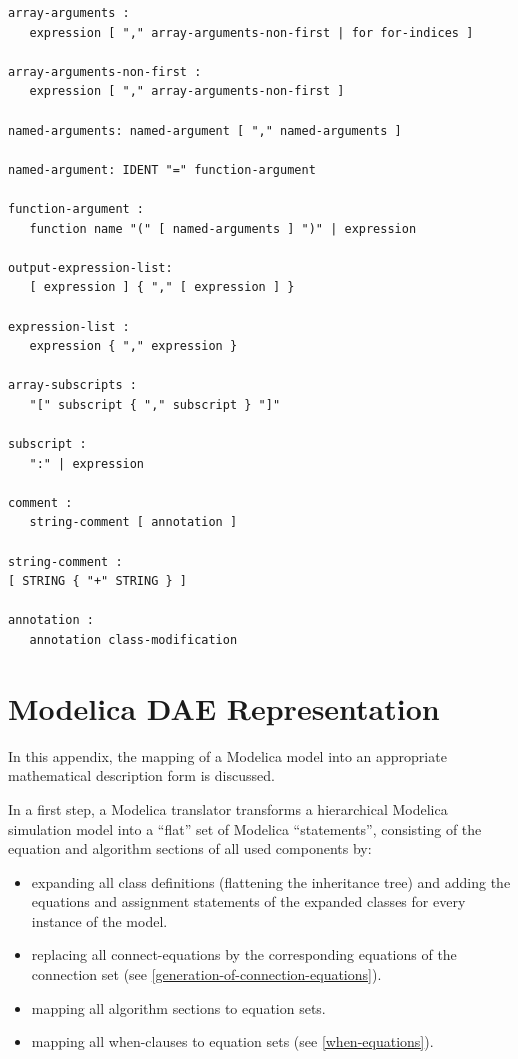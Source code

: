 \documentclass[10pt,a4paper]{report}
\def\doublelabel#1{\label{#1}\hypertarget{#1}{}}
\begin{document}
\begin{lstlisting}[language=grammar]
array-arguments :
   expression [ "," array-arguments-non-first | for for-indices ]

array-arguments-non-first :
   expression [ "," array-arguments-non-first ]

named-arguments: named-argument [ "," named-arguments ]

named-argument: IDENT "=" function-argument

function-argument :
   function name "(" [ named-arguments ] ")" | expression
   
output-expression-list:
   [ expression ] { "," [ expression ] }
   
expression-list :
   expression { "," expression }
   
array-subscripts :
   "[" subscript { "," subscript } "]"
   
subscript :
   ":" | expression
   
comment :
   string-comment [ annotation ]
   
string-comment :
[ STRING { "+" STRING } ]

annotation :
   annotation class-modification
\end{lstlisting}
\chapter{Modelica DAE Representation}\doublelabel{modelica-dae-representation}

In this appendix, the mapping of a Modelica model into an appropriate
mathematical description form is discussed.

In a first step, a Modelica translator transforms a hierarchical
Modelica simulation model into a ``flat'' set of Modelica
``statements'', consisting of the equation and algorithm sections of all
used components by:

\begin{itemize}
\item
  expanding all class definitions (flattening the inheritance tree) and
  adding the equations and assignment statements of the expanded classes
  for every instance of the model.
\item
  replacing all connect-equations by the corresponding equations of the
  connection set (see \ref{generation-of-connection-equations}).
\item
  mapping all algorithm sections to equation sets.
\item
  mapping all when-clauses to equation sets (see \ref{when-equations}).
\end{itemize}
\end{document}
